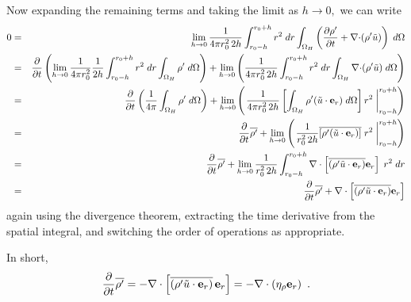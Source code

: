 Now expanding the remaining terms and taking the limit as $h \rightarrow 0,$ we can write 
\begin{eqnarray} 
0 &=& \lim_{h\rightarrow 0} \frac{1}{4\pi r_0^2 \, 2h} \int_{r_0-h}^{r_0+h} r^2 \; dr \int_{\Omega_H} 
    \left(\frac{\partial {\rho^{\prime}}}{\partial t} + \nabla \mathbf{\cdot} ( {\rho^{\prime}} \tilde{u} ) \right) \; d\Omega \nonumber \\
&=& \frac{\partial}{\partial t} \left( \lim_{h\rightarrow 0} \frac{1}{4\pi r_0^2} \frac{1}{2h} 
  \int_{r_0-h}^{r_0+h} r^2 \; dr \int_{\Omega_H}  {\rho^{\prime}} \;d\Omega \right) +
\lim_{h\rightarrow 0} \left( \frac{1}{4\pi r_0^2 \, 2h}  
  \int_{r_0-h}^{r_0+h} r^2 \; dr \int_{\Omega_H}  \nabla \mathbf{\cdot} ( {\rho^{\prime}} \tilde{u} ) \; d\Omega \right) \nonumber \\
&=& \frac{\partial}{\partial t} \left(\frac{1}{4\pi} \int_{\Omega_H}  {\rho^{\prime}} \; d\Omega \right) +
\lim_{h\rightarrow 0} \left( \left .  \frac{1}{4\pi r_0^2 \, 2h}  
\left [ \int_{\Omega_H} {\rho^{\prime}} (\tilde{u} \cdot \mathbf{e}_r) \; d\Omega  \right]  r^2\; \right |_{r_0-h}^{r_0+h} \right) \nonumber  \\
&=&  \frac{\partial}{\partial t} \overline{{\rho^{\prime}}} + \lim_{h\rightarrow 0} \left( \left .  \frac{1}{r_0^2 \, 2h}
\overline{[{\rho^{\prime}} (\tilde{u} \cdot \mathbf{e}_r)]} \; r^2 \; \right |_{r_0-h}^{r_0+h} \right) \nonumber  \\
&=&  \frac{\partial}{\partial t} \overline{{\rho^{\prime}}} + 
\lim_{h\rightarrow 0} \frac{1}{r_0^2 \, 2h} \int_{r_0-h}^{r_0+h} \nabla \cdot \left[\overline{\left({\rho^{\prime}}\tilde{u} \cdot \mathbf{e}_r\right)} \mathbf{e}_r \right]\;  r^2 \; dr \nonumber \\
&=&  \frac{\partial}{\partial t} \overline{{\rho^{\prime}}} + \nabla \cdot \left[ \overline{\left({\rho^{\prime}} \tilde{u} \cdot \mathbf{e}_r\right)} \mathbf{e}_r \right]
\end{eqnarray} 
again using the divergence theorem, extracting the time derivative from the spatial integral,
and switching the order of operations as appropriate.

In short, 
\begin{equation}
\frac{\partial}{\partial t} \overline{{\rho^{\prime}}} = 
- \nabla \cdot \left [ \overline{\left({\rho^{\prime}} \tilde{u} \cdot \mathbf{e}_r\right)} \, \mathbf{e}_r \right ] = 
- \nabla \cdot ( \eta_{\rho} \mathbf{e}_r )
 \enskip .\label{eq:rhopbar} 
\end{equation} 

